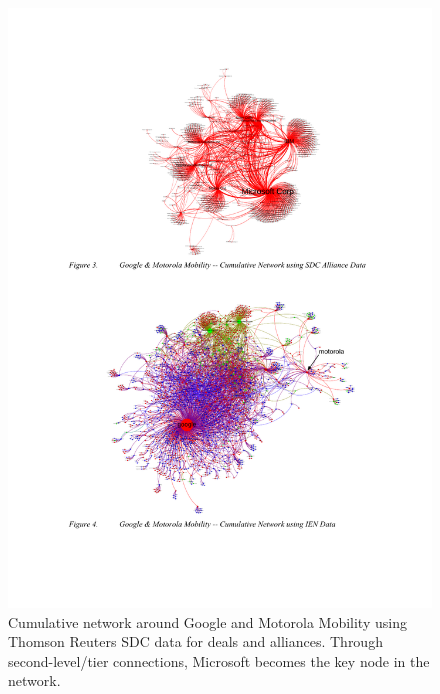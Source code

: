 \begin{figure}[htb]
\centering
\includegraphics[]{figure/Mobile-Ecosystem-Google-Motorola-SDC.pdf}
\caption{Cumulative network around Google and Motorola Mobility using Thomson Reuters SDC data for deals and alliances. Through second-level/tier connections, Microsoft becomes the key node in the network. \citep{Basole2012UnderstandingApproach}}
\label{fig:mobile-ecosystem-sdc}
\end{figure}


